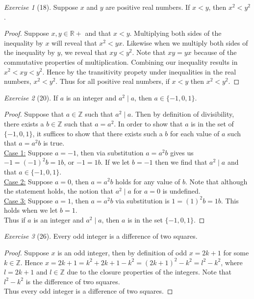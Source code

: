 \documentclass[12pt]{amsart}
\theoremstyle{remark}
\newtheorem*{exercise}{Exercise}%
\def\RR{\ensuremath{\mathbb R}}
\def\ZZ{\ensuremath{\mathbb Z}}
\theoremstyle{mycomment}
\begin{document}
\begin{exercise}[18] Suppose $x$ and $y$ are positive real numbers. If $x<y$, then $x^{2}<y^{2}$.
\begin{proof}
Suppose $x,y \in \RR+$ and that $x < y$. Multiplying both sides of the inequality by $x$ will reveal that $x^2 < yx$. Likewise when we multiply both sides of the inequality by $y$, we reveal that $xy < y^2$. Note that $xy = yx$ because of the commutative properties of multiplication. Combining our inequality results in $x^2 < xy < y^2$. Hence by the transitivity propety under inequalities in the real numbers, $x^2 < y^2$. Thus for all positive real numbers, if $x < y$ then $x^2 < y^2$.
\end{proof}
\end{exercise}

\begin{exercise}[20] If $a$ is an integer and $a^{2}\mid a$, then $a\in\{-1,0,1\}$.
\begin{proof}
	Suppose that $a \in \ZZ$ such that $a^{2}\mid a$. Then by definition of divisibility, there exists a $b \in \ZZ$ such that $a = a^2$. In order to show that $a$ is in the set of $\{-1,0,1\}$, it suffices to show that there exists such a $b$ for each value of $a$ such that $a = a^2b$ is true.
	\\ \underline{Case 1:} Suppose $a = -1$, then via substitution $a = a^2b$ gives us $-1 = (-1)^2b = 1b$, or $-1 = 1b$. If we let $b = -1$ then we find that $a^2 \mid a$ and that $a\in\{-1,0,1\}$. 
	\\ \underline{Case 2:} Suppose $a = 0$, then $a = a^2b$ holds for any value of $b$. Note that although the statement holds, the notion that $a^{2} \mid a$ for $a = 0$ is undefined.
	\\ \underline{Case 3:} Suppose $a = 1$, then $a = a^2b$ via substitution is $1 = (1)^2b = 1b$. This holds when we let $b = 1$.
\\	Thus if $a$ is an integer and $a^{2}\mid a$, then $a$ is in the set $\{-1, 0, 1\}.$
\end{proof}
\end{exercise}

\begin{exercise}[26] Every odd integer is a difference of two squares. 
\begin{proof}
Suppose $x$ is an odd integer, then by definition of odd $x = 2k + 1$ for some $k \in \ZZ$. Hence $x = 2k + 1 = k^2 + 2k + 1 - k^2 = (2k+1)^2 - k^2 = l^2 - k^2$, where $l = 2k+1$ and $l \in \ZZ$ due to the closure properties of the integers. Note that $l^2 - k^2$ is the difference of two squares.
\\ Thus every odd integer is a difference of two squares.
\end{proof}
\end{exercise}
\end{document}
